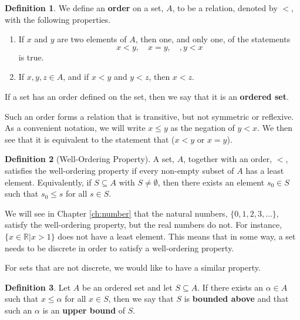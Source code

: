 \documentclass[
]{book}
\providecommand{\tightlist}{%
  \setlength{\itemsep}{0pt}\setlength{\parskip}{0pt}}
\theoremstyle{definition}
\newtheorem{definition}{Definition}[chapter]
\theoremstyle{definition}
\theoremstyle{definition}
\theoremstyle{remark}
\begin{document}
\begin{definition}
\protect\hypertarget{def:unnamed-chunk-45}{}{\label{def:unnamed-chunk-45} }We define an \textbf{order} on a set, \(A\), to be a relation, denoted by \(<\), with the following properties.

\begin{enumerate}
\def\labelenumi{\arabic{enumi}.}
\tightlist
\item
  If \(x\) and \(y\) are two elements of \(A\), then one, and only one, of the statements \[x<y, \quad x=y, \quad, y<x\] is true.
\item
  If \(x,y,z \in A\), and if \(x<y\) and \(y<z\), then \(x<z\).
\end{enumerate}

If a set has an order defined on the set, then we say that it is an \textbf{ordered set}.
\end{definition}

Such an order forms a relation that is transitive, but not symmetric or reflexive. As a convenient notation, we will write \(x\leq y\) as the negation of \(y<x\). We then see that it is equivalent to the statement that (\(x<y\) or \(x=y\)).

\begin{definition}[Well-Ordering Property]
\protect\hypertarget{def:well-ordering}{}{\label{def:well-ordering} {} }A set, \(A\), together with an order, \(<\), satisfies the well-ordering property if every non-empty subset of \(A\) has a least element. Equivalently, if \(S\subseteq A\) with \(S\neq \emptyset\), then there exists an element \(s_0\in S\) such that \(s_0 \leq s\) for all \(s\in S\).
\end{definition}

We will see in Chapter \ref{ch:number} that the natural numbers, \(\{0,1,2,3,\ldots\}\), satisfy the well-ordering property, but the real numbers do not. For instance, \(\{x\in \mathbb{R}\vert x>1\}\) does not have a least element. This means that in some way, a set needs to be discrete in order to satisfy a well-ordering property.

For sets that are not discrete, we would like to have a similar property.

\begin{definition}
\protect\hypertarget{def:unnamed-chunk-46}{}{\label{def:unnamed-chunk-46} }Let \(A\) be an ordered set and let \(S\subseteq A\). If there exists an \(\alpha \in A\) such that \(x\leq \alpha\) for all \(x\in S\), then we say that \(S\) is \textbf{bounded above} and that such an \(\alpha\) is an \textbf{upper bound} of \(S\).
\end{definition}
\end{document}
